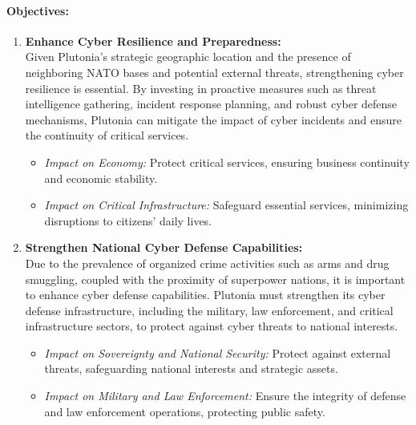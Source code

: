 \documentclass[
	a4paper, %
	10pt, %
]{CSSullivanBusinessReport}
\begin{document}
\begin{fullwidth}
\begin{justify}
\paragraph{Objectives:}
\begin{enumerate}
	\item \textbf{Enhance Cyber Resilience and Preparedness:} \\Given Plutonia's strategic geographic location and the presence of neighboring NATO bases and potential external threats, strengthening cyber resilience is essential. By investing in proactive measures such as threat intelligence gathering, incident response planning, and robust cyber defense mechanisms, Plutonia can mitigate the impact of cyber incidents and ensure the continuity of critical services.
		\begin{itemize}
			\item \textit{Impact on Economy:} Protect critical services, ensuring business continuity and economic stability.
			\item \textit{Impact on Critical Infrastructure:} Safeguard essential services, minimizing disruptions to citizens' daily lives.
		\end{itemize}
	\item \textbf{Strengthen National Cyber Defense Capabilities:} \\Due to the prevalence of organized crime activities such as arms and drug smuggling, coupled with the proximity of superpower nations, it is important to enhance cyber defense capabilities. Plutonia must strengthen its cyber defense infrastructure, including the military, law enforcement, and critical infrastructure sectors, to protect against cyber threats to national interests.
		\begin{itemize}
			\item \textit{Impact on Sovereignty and National Security:} Protect against external threats, safeguarding national interests and strategic assets.
			\item \textit{Impact on Military and Law Enforcement:} Ensure the integrity of defense and law enforcement operations, protecting public safety.


\end{itemize}
\end{enumerate}
\end{justify}
\end{fullwidth}
\end{document}
